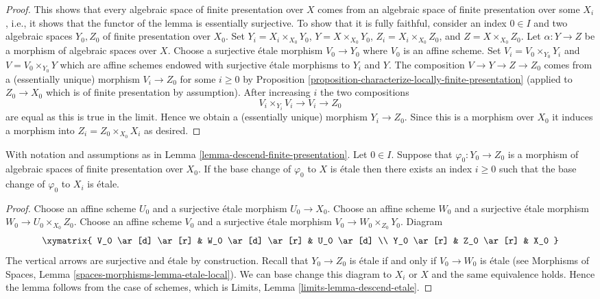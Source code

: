 \begin{proof}
\medskip\noindent
This shows that every algebraic space of finite presentation over $X$ comes
from an algebraic space of finite presentation over some $X_i$, i.e.,
it shows that the functor of the lemma is essentially surjective. To
show that it is fully faithful, consider an index $0 \in I$ and two
algebraic spaces $Y_0, Z_0$ of finite presentation over $X_0$.
Set $Y_i = X_i \times_{X_0} Y_0$, $Y = X \times_{X_0} Y_0$,
$Z_i = X_i \times_{X_0} Z_0$, and $Z = X \times_{X_0} Z_0$. Let
$\alpha : Y \to Z$ be a morphism of algebraic spaces over $X$.
Choose a surjective \'etale morphism $V_0 \to Y_0$ where $V_0$ is
an affine scheme. Set $V_i = V_0 \times_{Y_0} Y_i$ and
$V = V_0 \times_{Y_0} Y$ which are affine schemes endowed with
surjective \'etale morphisms to $Y_i$ and $Y$. The composition
$V \to Y \to Z \to Z_0$ comes from a (essentially unique) morphism
$V_i \to Z_0$ for some $i \geq 0$ by
Proposition \ref{proposition-characterize-locally-finite-presentation}
(applied to $Z_0 \to X_0$ which is of finite presentation by assumption).
After increasing $i$ the two compositions
$$
V_i \times_{Y_i} V_i \to V_i \to Z_0
$$
are equal as this is true in the limit. Hence we obtain a (essentially unique)
morphism $Y_i \to Z_0$. Since this is a morphism over $X_0$
it induces a morphism into $Z_i = Z_0 \times_{X_0} X_i$ as desired.
\end{proof}

\begin{lemma}
\label{lemma-descend-etale}
With notation and assumptions as in
Lemma \ref{lemma-descend-finite-presentation}.
Let $0 \in I$. Suppose that $\varphi_0 : Y_0 \to Z_0$
is a morphism of algebraic spaces of finite presentation over $X_0$.
If the base change of $\varphi_0$ to $X$ is \'etale
then there exists an index $i \geq 0$ such that
the base change of $\varphi_0$ to $X_i$ is \'etale.
\end{lemma}

\begin{proof}
Choose an affine scheme $U_0$ and a surjective \'etale morphism
$U_0 \to X_0$. Choose an affine scheme $W_0$ and a surjective \'etale
morphism $W_0 \to U_0 \times_{X_0} Z_0$. Choose an affine scheme
$V_0$ and a surjective \'etale morphism $V_0 \to W_0 \times_{Z_0} Y_0$.
Diagram
$$
\xymatrix{
V_0 \ar[d] \ar[r] & W_0 \ar[d] \ar[r] & U_0 \ar[d] \\
Y_0 \ar[r] & Z_0 \ar[r] & X_0
}
$$
The vertical arrows are surjective and \'etale by construction.
Recall that $Y_0 \to Z_0$ is \'etale if and only if $V_0 \to W_0$ is
\'etale (see
Morphisms of Spaces, Lemma \ref{spaces-morphisms-lemma-etale-local}).
We can base change this diagram to $X_i$ or $X$ and the same equivalence
holds. Hence the lemma follows from the case of schemes, which is
Limits, Lemma \ref{limits-lemma-descend-etale}.
\end{proof}

